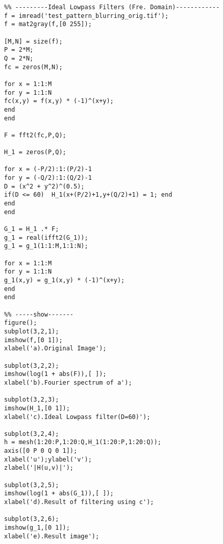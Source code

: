 \documentclass[12pt,a4paper]{article}
\begin{document}
\lstset{language=Matlab}
\begin{lstlisting}
%% ---------Ideal Lowpass Filters (Fre. Domain)------------
f = imread('test_pattern_blurring_orig.tif');
f = mat2gray(f,[0 255]);

[M,N] = size(f);
P = 2*M;
Q = 2*N;
fc = zeros(M,N);

for x = 1:1:M
for y = 1:1:N
fc(x,y) = f(x,y) * (-1)^(x+y);
end
end

F = fft2(fc,P,Q);

H_1 = zeros(P,Q);

for x = (-P/2):1:(P/2)-1
for y = (-Q/2):1:(Q/2)-1
D = (x^2 + y^2)^(0.5);
if(D <= 60)  H_1(x+(P/2)+1,y+(Q/2)+1) = 1; end    
end
end

G_1 = H_1 .* F;
g_1 = real(ifft2(G_1));
g_1 = g_1(1:1:M,1:1:N);   

for x = 1:1:M
for y = 1:1:N
g_1(x,y) = g_1(x,y) * (-1)^(x+y);
end
end

%% -----show-------
figure();
subplot(3,2,1);
imshow(f,[0 1]);
xlabel('a).Original Image');

subplot(3,2,2);
imshow(log(1 + abs(F)),[ ]);
xlabel('b).Fourier spectrum of a');

subplot(3,2,3);
imshow(H_1,[0 1]);
xlabel('c).Ideal Lowpass filter(D=60)');

subplot(3,2,4);
h = mesh(1:20:P,1:20:Q,H_1(1:20:P,1:20:Q));
axis([0 P 0 Q 0 1]);
xlabel('u');ylabel('v');
zlabel('|H(u,v)|');

subplot(3,2,5);
imshow(log(1 + abs(G_1)),[ ]);
xlabel('d).Result of filtering using c');

subplot(3,2,6);
imshow(g_1,[0 1]);
xlabel('e).Result image');
\end{lstlisting}

\newpage
\end{document}
